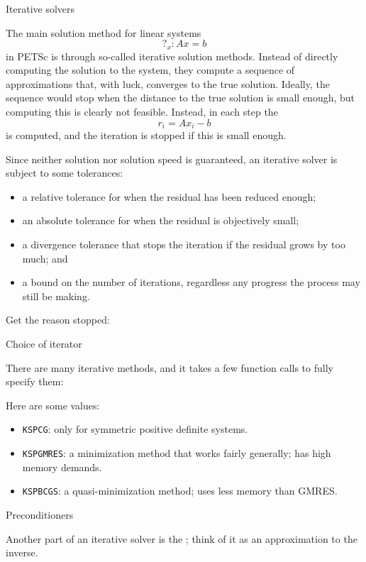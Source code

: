  {Iterative solvers}

The main solution method for linear systems
\[ ?_x\colon Ax=b \]
in PETSc is through
so-called iterative solution methods. Instead of directly computing
the solution to the system, they compute a sequence of approximations
that, with luck, converges to the true solution. Ideally, the sequence
would stop when the distance to the true solution is small enough, but
computing this is clearly not feasible. Instead, in each step the
\[ r_i=Ax_i-b \]
is computed, and the iteration is stopped if this is small enough.

Since neither
solution nor solution speed is guaranteed, an iterative solver is
subject to some tolerances:
\begin{itemize}
\item a relative tolerance for when the residual has been reduced
  enough;
\item an absolute tolerance for when the residual is objectively
  small;
\item a divergence tolerance that stops the iteration if the residual
  grows by too much; and
\item a bound on the number of iterations, regardless any progress the
  process may still be making.
\end{itemize}


Get the reason  stopped:
%

 {Choice of iterator}

There are many iterative methods, and it takes a few function calls to fully specify them:


Here are some values:
\begin{itemize}
\item \lstinline{KSPCG}: only for symmetric positive definite systems.
\item \lstinline{KSPGMRES}: a minimization method that works fairly
  generally; has high memory demands.
\item \lstinline{KSPBCGS}: a quasi-minimization method; uses less memory than GMRES.
\end{itemize}

 {Preconditioners}

Another part of an iterative solver is the
; think of it as an approximation to the inverse.


